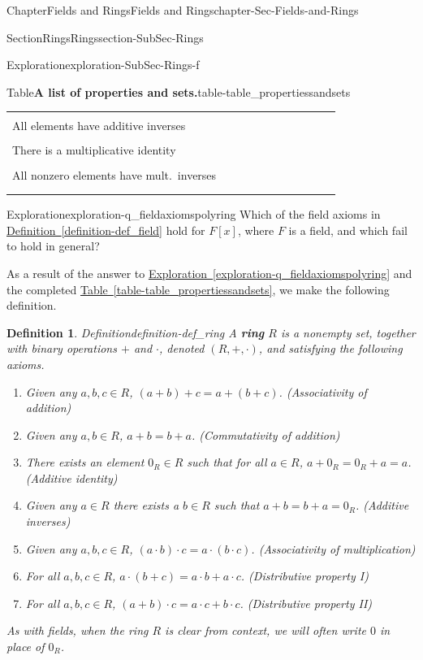 \documentclass[oneside,10pt,]{book}
\newcommand{\xreffont}{\relax}
\newcommand{\terminology}[1]{\textbf{#1}}
\numberwithin{equation}{section}
\newcommand{\hrulethin}  {\noalign{\hrule height 0.04em}}
\newtheorem{definition}[theorem]{Definition}
\begin{document}
\begin{chapterptx}{Chapter}{Fields and Rings}{}{Fields and Rings}{}{}{chapter-Sec-Fields-and-Rings}
\begin{sectionptx}{Section}{Rings}{}{Rings}{}{}{section-SubSec-Rings}
\begin{exploration}{Exploration}{}{exploration-SubSec-Rings-f}
\begin{tableptx}{Table}{\textbf{A list of properties and sets.}}{table-table_propertiessandsets}{}
{\begin{tabular}{lllllllllll}
&&&&&&&&&&\tabularnewline\hrulethin
All elements have additive inverses&&&&&&&&&&\tabularnewline[0pt]
&&&&&&&&&&\tabularnewline\hrulethin
There is a multiplicative identity&&&&&&&&&&\tabularnewline[0pt]
&&&&&&&&&&\tabularnewline\hrulethin
All nonzero elements have mult.~inverses&&&&&&&&&&\tabularnewline[0pt]
&&&&&&&&&&\tabularnewline\hrulethin
\end{tabular}
}%
\end{tableptx}%
\end{exploration}%
\begin{exploration}{Exploration}{}{exploration-q_fieldaxiomspolyring}%
Which of the field axioms in \hyperref[definition-def_field]{Definition~{\xreffont\ref{definition-def_field}}} hold for \(F[x]\), where \(F\) is a field, and which fail to hold in general?%
\end{exploration}%
As a result of the answer to \hyperref[exploration-q_fieldaxiomspolyring]{Exploration~{\xreffont\ref{exploration-q_fieldaxiomspolyring}}} and the completed \hyperref[table-table_propertiessandsets]{Table~{\xreffont\ref{table-table_propertiessandsets}}}, we make the following definition.%
\begin{definition}{Definition}{}{definition-def_ring}%
%
A \terminology{ring} \(R\) is a nonempty set, together with binary operations \(+\) and \(\cdot\), denoted \((R,+,\cdot)\), and satisfying the following axioms.%
\begin{enumerate}
\item{}Given any \(a,b,c\in R\), \((a+b)+c = a+(b+c)\). (Associativity of addition)%
\item{}Given any \(a,b\in R\), \(a+b= b+a\). (Commutativity of addition)%
\item{}There exists an element \(0_R\in R\) such that for all \(a\in R\), \(a+0_R = 0_R + a = a\). (Additive identity)%
\item{}Given any \(a\in R\) there exists a \(b\in R\) such that \(a+b = b + a =0_R\). (Additive inverses)%
\item{}Given any \(a,b,c\in R\), \((a\cdot b)\cdot c = a\cdot (b\cdot c)\). (Associativity of multiplication)%
\item{}For all \(a,b,c\in R\), \(a\cdot (b+c) = a\cdot b + a\cdot c\). (Distributive property I)%
\item{}For all \(a,b,c\in R\), \((a+b)\cdot c = a\cdot c + b\cdot c\). (Distributive property II)%
\end{enumerate}
As with fields, when the ring \(R\) is clear from context, we will often write \(0\) in place of \(0_R\).%

\end{definition}
\end{sectionptx}
\end{chapterptx}
\end{document}
